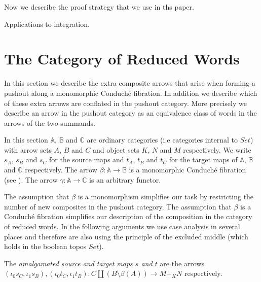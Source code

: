 \documentclass{article}
\begin{document}
Now we describe the proof strategy that we use in ths paper.

Applications to integration.

\section{The Category of Reduced Words} %
\label{sub:the_category_of_reduced_words}

In this section we describe the extra composite arrows that arise when forming a pushout along a monomorphic Conduch\'{e} fibration.
In addition we describe which of these extra arrows are conflated in the pushout category.
More precisely we describe an arrow in the pushout category as an equivalence class of words in the arrows of the two summands.

\begin{notation}\label{a-b-and-c}
	In this section $\mathbb{A}$, $\mathbb{B}$ and $\mathbb{C}$ are ordinary categories (i.e categories internal to $Set$) with arrow sets $A$, $B$ and $C$ and object sets $K$, $N$ and $M$ respectively.
	We write $s_A$, $s_B$ and $s_C$ for the source maps and $t_A$, $t_B$ and $t_C$ for the target  maps of $\mathbb{A}$, $\mathbb{B}$ and $\mathbb{C}$ respectively.
	The arrow $\beta:\mathbb{A}\rightarrow \mathbb{B}$ is a monomorphic Conduch\'{e} fibration (see ).
	The arrow $\gamma: \mathbb{A}\rightarrow \mathbb{C}$ is an arbitrary functor.
\end{notation}

\begin{remark}
	The assumption that $\beta$ is a monomorphism simplifies our task by restricting the number of new composites in the pushout category.
	The assumption that $\beta$ is a Conduch\'e fibration simplifies our description of the composition in the category of reduced words.
	In the following arguments we use case analysis in several places and therefore are also using the principle of the excluded middle (which holds in the boolean topos $Set$).
\end{remark}

\begin{definition}
\label{amalgamated-source-and-target}
	The \emph{amalgamated source and target maps $s$ and $t$} are the arrows $(\iota_0 s_C,\iota_1 s_B),(\iota_0 t_C,\iota_1 t_B):C\amalg (B\setminus \beta(A)) \rightarrow M+_{K}N$ respectively.
\end{definition}
\end{document}
